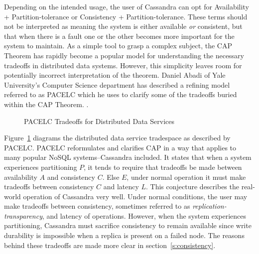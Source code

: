 \documentclass[twocolumn]{article}
\begin{document}
Depending on the intended usage, the user of Cassandra can opt for Availability + Partition-tolerance or Consistency + Partition-tolerance.  These terms should not be interpreted as meaning the system is either available \emph{or} consistent, but that when there is a fault one or the other becomes more important for the system to maintain.  As a simple tool to grasp a complex subject, the CAP Theorem has rapidly become a popular model for understanding the necessary tradeoffs in distributed data systems.  However, this simplicity leaves room for potentially incorrect interpretation of the theorem.  Daniel Abadi of Yale University's Computer Science department has described a refining model referred to as PACELC which he uses to clarify some of the tradeoffs buried within the CAP Theorem. \cite{ref:pacelc}.

\begin{figure}[hp]
  \begin{center}
  \end{center}
  \caption{PACELC Tradeoffs for Distributed Data Services}
  \label{fig:pacelc}
\end{figure}

Figure~\ref{fig:pacelc} diagrams the distributed data service tradespace as described by PACELC.  PACELC reformulates and clarifies CAP in a way that applies to many popular NoSQL systems--Cassandra included.  It states that when a system experiences partitioning $P$, it tends to require that tradeoffs be made between availability $A$ and consistency $C$.  Else $E$, under normal operation it must make tradeoffs between consistency $C$ and latency $L$.  This conjecture describes the real-world operation of Cassandra very well.  Under normal conditions, the user may make tradeoffs between consistency, sometimes referred to as \emph{replication-transparency}, and latency of operations.  However, when the system experiences partitioning, Cassandra must sacrifice consistency to remain available since write durability is impossible when a replica is present on a failed node.  The reasons behind these tradeoffs are made more clear in section~\ref{s:consistency}.
\end{document}
